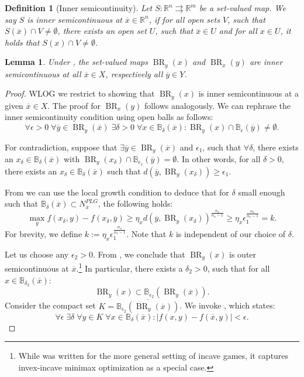 \documentclass{article}
\newtheorem{lemma}{Lemma}
\newtheorem{definition}{Definition}[section]
\newcommand{\R}{\mathbb{R}}
\newcommand{\B}{\mathbb{B}}
\DeclareMathOperator{\BR}{BR}
\begin{document}
\begin{definition}[Inner semicontinuity]
    \label{def:isc}
    Let $S:\R^{n} \rightrightarrows \R^{m}$ be a set-valued map. We say $S$ is inner semicontinuous at $\overline{x} \in \R^n$, if for all open sets $V$, such that $S(\overline{x})\cap V \neq \emptyset$, there exists an open set $U$, such that $\overline{x}\in U$ and for all $x\in U$, it holds that $S(x)\cap V \neq \emptyset$.
\end{definition}

\begin{lemma}
    \label{lem:isc}
    Under , the set-valued maps $\BR_y(x)$ and $\BR_x(y)$ are inner semicontinuous at all $\overline{x}\in X$, respectively all $\overline{y}\in Y$.
\end{lemma}
\begin{proof}
WLOG we restrict to showing that $\BR_y(x)$ is inner semicontinuous at a given $\overline{x}\in X$. The proof for $\BR_x(y)$ follows analogously.
We can rephrase the inner semicontinuity condition using open balls as follows: 
\[
\forall \epsilon>0\; \forall \overline{y}\in \BR_y(\overline{x})\; \exists \delta>0\; \forall x \in \B_{\delta}(\overline{x}): \BR_y(x) \cap \B_{\epsilon}(\overline{y}) \neq \emptyset.
\]

For contradiction, suppose that $\exists \overline{y}\in \BR_y(\overline{x})$ and $\epsilon_1$, such that $\forall \delta$, there exists an $x_\delta \in \B_{\delta}(\overline{x})$ with $\BR_y(x_\delta) \cap \B_{\epsilon_1}(\overline{y}) = \emptyset$. In other words, for all $\delta>0$, there exists an $x_\delta \in \B_{\delta}(\overline{x})$ such that $d(\overline{y}, \BR_y(x_\delta)) \geq \epsilon_1$.

From  we can use the local growth condition to deduce that for $\delta$ small enough such that $\B_{\delta}(\overline{x})\subset N_{\overline{x}}^{PLG}$, the following holds:
\[
\max_y f(x_\delta,y)-f(x_\delta,\overline{y}) \geq \eta_x d(\overline{y},\BR_y(x_\delta))^{\frac{\alpha_x}{\alpha_x-1}} \geq \eta_x \epsilon_1^{\frac{\alpha_x}{\alpha_x-1}}=k.
\] For brevity, we define $k:=\eta_x \epsilon_1^{\frac{\alpha_x}{\alpha_x-1}}$. Note that $k$ is independent of our choice of $\delta$.

Let us choose any $\epsilon_2>0$. From , we conclude that $\BR_y(x)$ is outer semicontinuous at $\overline{x}$.\footnote{While  was written for the more general setting of incave games, it captures invex-incave minimax optimization as a special case.} In particular, there exists a $\delta_2>0$, such that for all $x\in \B_{\delta_2}(\overline{x})$:
\[
\BR_y(x) \subset \B_{\epsilon_2}(\BR_y(\overline{x})).
\]
Consider the compact set $K= \overline{\B_{\epsilon_2}(\BR_y(\overline{x}))}$. We invoke , which states:
\begin{equation}
    \label{eq:uniformconteps}
    \forall \epsilon \; \exists \delta \; \forall y \in K \; \forall x \in \B_{\delta}(\overline{x}): |f(x,y)-f(\overline{x},y)|<\epsilon.
\end{equation}


\end{proof}
\end{document}
